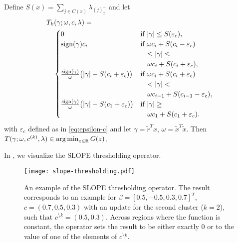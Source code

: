 \begin{theorem}
  \label{thm:thresholding-operator}
  Define \(S(x) = \sum_{j \in C(x)}\lambda_{(j)^-_{x}}\) and
  let
  \[
    \begin{multlined}
      T_k(\gamma; \omega, c, \lambda) = \\
      \begin{cases}
        0
            & \text{if } |\gamma| \leq S(\varepsilon_c),               \\
        \sign(\gamma)c_i
            & \text{if } \omega c_i + S(c_i - \varepsilon_c)           \\
            & \quad \leq |\gamma| \leq                                 \\
            & \quad \omega c_i + S(c_i + \varepsilon_c),               \\
        \frac{\sign(\gamma)}{\omega} \big( |\gamma| - S(c_i + \varepsilon_c) \big)
            & \text{if } \omega c_i + S(c_i + {\varepsilon_c})         \\
            & \quad < |\gamma| <                                       \\
            & \quad \omega c_{i - 1} + S(c_{i - 1} - {\varepsilon_c}), \\
        \frac{\sign(\gamma)}{\omega} \big( |\gamma| - S(c_1 + {\varepsilon_c}) \big)
            & \text{if } |\gamma| \geq                                 \\
            & \quad \omega c_1 + S(c_1 + {\varepsilon_c}).
      \end{cases}
    \end{multlined}
  \]
  with \({\varepsilon_c}\) defined as in \eqref{eq:epsilon-c} and let
  \(\gamma = \tilde{r}^Tx\), \(\omega = \tilde{x}^T\tilde{x}\). Then
  \(T(\gamma; \omega, c^{(k)}, \lambda) \in \operatorname*{arg\,min}_{z \in \mathbb{R}} G(z)\).
\end{theorem}


In , we visualize the SLOPE thresholding operator.

\begin{figure*}[htb]
  \centering
  \texttt{[image: slope-thresholding.pdf]}
  \caption{%
  An example of the SLOPE thresholding operator. The result corresponds to an
  example for \(\beta = [0.5, -0.5, 0.3, 0.7]^T\), \(c = (0.7, 0.5, 0.3)\)
  with an update for the second cluster (\(k = 2\)), such that
  \(c^{\setminus k} = (0.5, 0.3)\). Across regions where the function is constant,
      the operator sets the result to be either exactly 0 or to the value of one
      of the elements of \(c^{\setminus k}\).
    }
  \label{fig:slope-thresholding}
\end{figure*}

